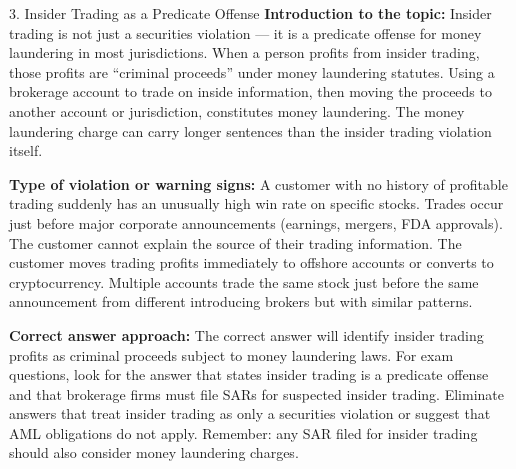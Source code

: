 \documentclass[11pt,a4paper]{beamer}
\begin{document}
\begin{frame}{3. Insider Trading as a Predicate Offense}
\tiny
\noindent\textbf{Introduction to the topic:} Insider trading is not just a securities violation — it is a predicate offense for money laundering in most jurisdictions. When a person profits from insider trading, those profits are “criminal proceeds” under money laundering statutes. Using a brokerage account to trade on inside information, then moving the proceeds to another account or jurisdiction, constitutes money laundering. The money laundering charge can carry longer sentences than the insider trading violation itself.

\vspace{0.1cm}
\noindent\textbf{Type of violation or warning signs:} A customer with no history of profitable trading suddenly has an unusually high win rate on specific stocks. Trades occur just before major corporate announcements (earnings, mergers, FDA approvals). The customer cannot explain the source of their trading information. The customer moves trading profits immediately to offshore accounts or converts to cryptocurrency. Multiple accounts trade the same stock just before the same announcement from different introducing brokers but with similar patterns.

\vspace{0.1cm}
\noindent\textbf{Correct answer approach:} The correct answer will identify insider trading profits as criminal proceeds subject to money laundering laws. For exam questions, look for the answer that states insider trading is a predicate offense and that brokerage firms must file SARs for suspected insider trading. Eliminate answers that treat insider trading as only a securities violation or suggest that AML obligations do not apply. Remember: any SAR filed for insider trading should also consider money laundering charges.
\end{frame}
\end{document}

